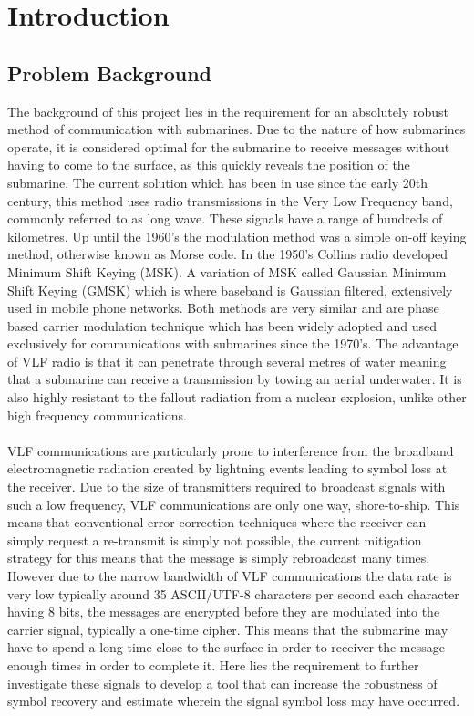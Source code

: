 \chapter{Introduction}
\section{Problem Background}
The background of this project lies in the requirement for an absolutely robust method of communication with submarines. Due to the nature of how submarines operate, it is considered optimal for the submarine to receive messages without having to come to the surface, as this quickly reveals the position of the submarine. The current solution which has been in use since the early 20th century, this method uses radio transmissions in the Very Low Frequency band, commonly referred to as long wave. These signals have a range of hundreds of kilometres. Up until the 1960's the modulation method was a simple on-off keying method, otherwise known as Morse code. In the 1950's Collins radio developed Minimum Shift Keying (MSK). A variation of MSK called Gaussian Minimum Shift Keying (GMSK) which is where baseband is Gaussian filtered, extensively used in mobile phone networks. Both methods are very similar and are
phase based carrier modulation technique which has been widely adopted and used exclusively for communications with submarines since the 1970's. The advantage of VLF radio is that it can penetrate through several metres of water meaning that a submarine can receive a transmission by towing an aerial underwater. It is also highly resistant to the fallout radiation from a nuclear explosion, unlike other high frequency communications.
\\\\
VLF communications are particularly prone to interference from the broadband electromagnetic radiation created by lightning events leading to symbol loss at the receiver. Due to the size of transmitters required to broadcast signals with such a low frequency, VLF communications are only one way, shore-to-ship. This means that conventional error correction techniques where the receiver can simply request a re-transmit is simply not possible, the current mitigation strategy for this means that the message is simply rebroadcast many times. However due to the narrow bandwidth of VLF communications the data rate is very low typically around 35 ASCII/UTF-8 characters per second each character having 8 bits, the messages are encrypted before they are modulated into the carrier signal, typically a one-time cipher. This means that the submarine may have to spend a long time close to the surface in order to receiver the message enough times in order to complete it. Here lies the requirement to further investigate these signals to develop a tool that can increase the robustness of symbol recovery and estimate wherein the signal symbol loss may have occurred.

